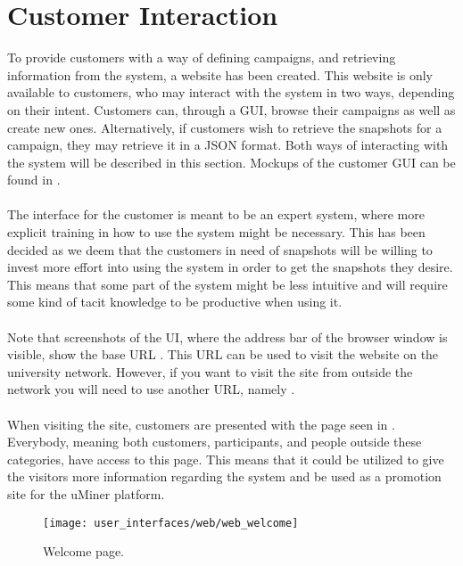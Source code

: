 
\section{Customer Interaction}
\label{sec:customer_interaction}
To provide customers with a way of defining campaigns, and retrieving information from the system, a website has been created. This website is only available to customers, who may interact with the system in two ways, depending on their intent. Customers can, through a GUI, browse their campaigns as well as create new ones. Alternatively, if customers wish to retrieve the snapshots for a campaign, they may retrieve it in a JSON format. Both ways of interacting with the system will be described in this section. Mockups of the customer GUI can be found in .   
\\\\
The interface for the customer is meant to be an expert system, where more explicit training in how to use the system might be necessary. This has been decided as we deem that the customers in need of snapshots will be willing to invest more effort into using the system in order to get the snapshots they desire. This means that some part of the system might be less intuitive and will require some kind of tacit knowledge to be productive when using it. 
\\\\
Note that screenshots of the UI, where the address bar of the browser window is visible, show the base URL . This URL can be used to visit the website on the university network. However, if you want to visit the site from outside the network you will need to use another URL, namely . 
\\\\
When visiting the site, customers are presented with the page seen in . Everybody, meaning both customers, participants, and people outside these categories, have access to this page. This means that it could be utilized to give the visitors more information regarding the system and be used as a promotion site for the uMiner platform. 

\begin{figure}[!htbp]
\centering
\texttt{[image: user\_interfaces/web/web\_welcome]}
\caption{Welcome page.}
\label{fig:web_welcome}
\end{figure}
\FloatBarrier

